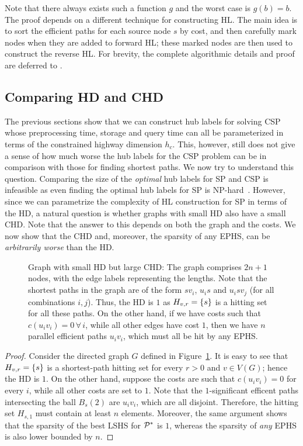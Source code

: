 Note that there always exists such a function $g$ and the worst case is $g(b)=b$.
The proof depends on a different technique for constructing HL.
The main idea is to sort the efficient paths for each source node $s$ by cost, and then carefully mark nodes when they are added to forward HL; these marked nodes are then used to construct the reverse HL.
For brevity, the complete algorithmic details and proof are deferred to \cite{TechReport}.

\subsection{Comparing HD and CHD}
\label{ssec:hdvschd}

The previous sections show that we can construct hub labels for solving CSP whose preprocessing time, storage and query time can all be parameterized in terms of the constrained highway dimension $h_c$. 
This, however, still does not give a sense of how much worse the hub labels for the CSP problem can be in comparison with those for finding shortest paths. 
We now try to understand this question.
Comparing the size of the \emph{optimal} hub labels for SP and CSP is infeasible as even finding the optimal hub labels for SP is NP-hard~\cite{babenko_hl_complexity}. 
However, since we can parametrize the complexity of HL construction for SP in terms of the HD, a natural question is whether graphs with small HD also have a small CHD. 
Note that the answer to this depends on both the graph and the costs.
We now show that the CHD and, moreover, the sparsity of any EPHS, can be \emph{arbitrarily worse} than the HD. 
\begin{figure}
	
	\caption{Graph with small HD but large CHD: The graph comprises $2n+1$ nodes, with the edge labels representing the lengths. Note that the shortest paths in the graph are of the form $sv_i$, $u_is$ and $u_isv_j$ (for all combinations $i,j$). Thus, the HD is $1$ as $H_{v,r}=\{s\}$ is a hitting set for all these paths. On the other hand, if we have costs such that $c(u_iv_i)=0\,\forall\,i$, while all other edges have cost $1$, then we have $n$ parallel efficient paths $u_iv_i$, which must all be hit by any EPHS.}
	\label{fig:big_chd}
\end{figure}
\begin{proof}
	Consider the directed graph $G$ defined in Figure~\ref{fig:big_chd}.
	It is easy to see that $H_{v,r}=\{s\}$ is a shortest-path hitting set for every $r>0$ and $v\in V(G)$; hence the HD is $1$.
	On the other hand, suppose the costs are such that $c(u_iv_i)=0$ for every $i$, while all other costs are set to $1$.
	Note that the $1$-significant efficent paths intersecting the ball $B_s(2)$ are $u_iv_i$, which are all disjoint.
	Therefore, the hitting set $H_{s,1}$ must contain at least $n$ elements. Moreover, the same argument shows that the sparsity of the best LSHS for $\mathcal{P}^*$ is $1$, whereas the sparsity of \emph{any} EPHS is also lower bounded by $n$.
\end{proof}

